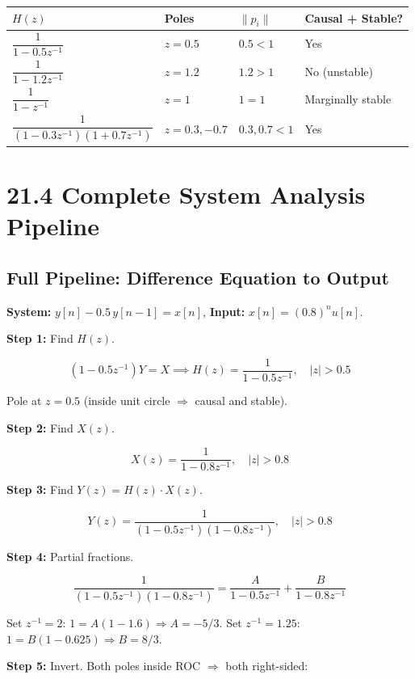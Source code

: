 \documentclass[11pt]{article}
\begin{document}
\begin{center}
\begin{tabular}{|l|l|l|l|}
\hline
\textbf{$H(z)$} & \textbf{Poles} & \textbf{$\|p_i\|$} & \textbf{Causal + Stable?} \\
\hline
$\dfrac{1}{1 - 0.5 z^{-1}}$ & $z = 0.5$ & $0.5 < 1$ & Yes \\
\hline
$\dfrac{1}{1 - 1.2 z^{-1}}$ & $z = 1.2$ & $1.2 > 1$ & No (unstable) \\
\hline
$\dfrac{1}{1 - z^{-1}}$ & $z = 1$ & $1 = 1$ & Marginally stable \\
\hline
$\dfrac{1}{(1 - 0.3 z^{-1})(1 + 0.7 z^{-1})}$ & $z = 0.3, -0.7$ & $0.3, 0.7 < 1$ & Yes \\
\hline
\end{tabular}
\end{center}

\section*{21.4 Complete System Analysis Pipeline}

\subsection*{Full Pipeline: Difference Equation to Output}

\textbf{System:} $y[n] - 0.5\, y[n-1] = x[n]$, \textbf{Input:} $x[n] = (0.8)^n u[n]$.

\textbf{Step 1:} Find $H(z)$.

\[(1 - 0.5 z^{-1}) Y = X \implies H(z) = \frac{1}{1 - 0.5 z^{-1}}, \quad |z| > 0.5\]

Pole at $z = 0.5$ (inside unit circle $\Rightarrow$ causal and stable). \checkmark

\textbf{Step 2:} Find $X(z)$.

\[X(z) = \frac{1}{1 - 0.8 z^{-1}}, \quad |z| > 0.8\]

\textbf{Step 3:} Find $Y(z) = H(z) \cdot X(z)$.

\[Y(z) = \frac{1}{(1 - 0.5 z^{-1})(1 - 0.8 z^{-1})}, \quad |z| > 0.8\]

\textbf{Step 4:} Partial fractions.

\[\frac{1}{(1 - 0.5 z^{-1})(1 - 0.8 z^{-1})} = \frac{A}{1 - 0.5 z^{-1}} + \frac{B}{1 - 0.8 z^{-1}}\]

Set $z^{-1} = 2$: $1 = A(1 - 1.6) \Rightarrow A = -5/3$.
Set $z^{-1} = 1.25$: $1 = B(1 - 0.625) \Rightarrow B = 8/3$.

\textbf{Step 5:} Invert. Both poles inside ROC $\Rightarrow$ both right-sided:
\end{document}
